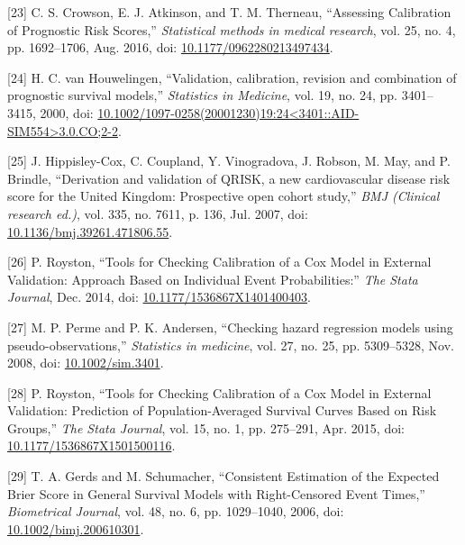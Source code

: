 \documentclass[12pt,PhD,twoside,openright]{muthesis}
\newenvironment{cslreferences}%
  {}%
  {\par}
\begin{document}
\begin{cslreferences}
\leavevmode\hypertarget{ref-crowson_assessing_2016}{}%
{[}23{]} C. S. Crowson, E. J. Atkinson, and T. M. Therneau, ``Assessing Calibration of Prognostic Risk Scores,'' \emph{Statistical methods in medical research}, vol. 25, no. 4, pp. 1692--1706, Aug. 2016, doi: \href{https://doi.org/10.1177/0962280213497434}{10.1177/0962280213497434}.

\leavevmode\hypertarget{ref-houwelingen_validation_2000}{}%
{[}24{]} H. C. van Houwelingen, ``Validation, calibration, revision and combination of prognostic survival models,'' \emph{Statistics in Medicine}, vol. 19, no. 24, pp. 3401--3415, 2000, doi: \href{https://doi.org/10.1002/1097-0258(20001230)19:24\%3C3401::AID-SIM554\%3E3.0.CO;2-2}{10.1002/1097-0258(20001230)19:24\textless3401::AID-SIM554\textgreater3.0.CO;2-2}.

\leavevmode\hypertarget{ref-hippisley-cox_derivation_2007}{}%
{[}25{]} J. Hippisley-Cox, C. Coupland, Y. Vinogradova, J. Robson, M. May, and P. Brindle, ``Derivation and validation of QRISK, a new cardiovascular disease risk score for the United Kingdom: Prospective open cohort study,'' \emph{BMJ (Clinical research ed.)}, vol. 335, no. 7611, p. 136, Jul. 2007, doi: \href{https://doi.org/10.1136/bmj.39261.471806.55}{10.1136/bmj.39261.471806.55}.

\leavevmode\hypertarget{ref-royston_tools_2014}{}%
{[}26{]} P. Royston, ``Tools for Checking Calibration of a Cox Model in External Validation: Approach Based on Individual Event Probabilities:'' \emph{The Stata Journal}, Dec. 2014, doi: \href{https://doi.org/10.1177/1536867X1401400403}{10.1177/1536867X1401400403}.

\leavevmode\hypertarget{ref-perme_checking_2008}{}%
{[}27{]} M. P. Perme and P. K. Andersen, ``Checking hazard regression models using pseudo-observations,'' \emph{Statistics in medicine}, vol. 27, no. 25, pp. 5309--5328, Nov. 2008, doi: \href{https://doi.org/10.1002/sim.3401}{10.1002/sim.3401}.

\leavevmode\hypertarget{ref-royston_tools_2015}{}%
{[}28{]} P. Royston, ``Tools for Checking Calibration of a Cox Model in External Validation: Prediction of Population-Averaged Survival Curves Based on Risk Groups,'' \emph{The Stata Journal}, vol. 15, no. 1, pp. 275--291, Apr. 2015, doi: \href{https://doi.org/10.1177/1536867X1501500116}{10.1177/1536867X1501500116}.

\leavevmode\hypertarget{ref-gerds_consistent_2006}{}%
{[}29{]} T. A. Gerds and M. Schumacher, ``Consistent Estimation of the Expected Brier Score in General Survival Models with Right-Censored Event Times,'' \emph{Biometrical Journal}, vol. 48, no. 6, pp. 1029--1040, 2006, doi: \href{https://doi.org/10.1002/bimj.200610301}{10.1002/bimj.200610301}.


\end{cslreferences}
\end{document}

